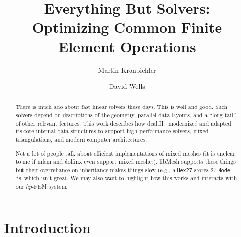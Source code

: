 \documentclass[11pt]{article}
\title{Everything But Solvers: Optimizing Common Finite Element Operations}
\author[1]{Martin Kronbichler}
\author[2,*]{David Wells}
\affil[1]{TODO}
\affil[2]{TODO}
\affil[*]{Corresponding author, \texttt{drwells@email.unc.edu}}
\begin{document}
\maketitle

\begin{abstract}
\noindent
There is much ado about fast linear solvers these days.
This is well and good.
Such solvers depend on descriptions of the geometry, parallel data layouts, and a ``long tail'' of other relevant features.
This work describes how deal.II~\cite{dealII96} modernized and adapted its core internal data structures to support high-performance solvers, mixed triangulations, and modern computer architectures.

Not a lot of people talk about efficient implementations of mixed meshes (it is unclear to me if mfem and dolfinx even support mixed meshes).
libMesh supports these things but their overreliance on inheritance makes things slow (e.g., a \texttt{Hex27} stores $27$ \texttt{Node *}s, which isn't great.
We may also want to highlight how this works and interacts with our \emph{hp}-FEM system.
\end{abstract}

\section{Introduction}
\label{sec:introduction}
\end{document}
